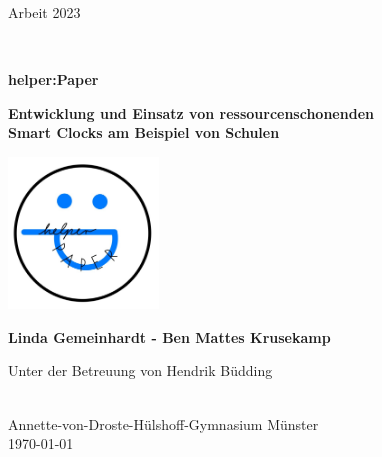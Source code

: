 \documentclass[10pt]{article}
\begin{document}
\begin{titlepage}
\begin{center}
{
\hspace{1.5em}
\begin{minipage}[c]{0.15\textwidth}
\vspace{0.15em}

\end{minipage}
\begin{minipage}[c]{0.15\textwidth}
 {\huge Arbeit 2023}
\end{minipage}
}
\\[9ex]
{\centerline{\huge\bfseries helper:Paper} 
\large \bfseries Entwicklung und Einsatz von ressourcenschonenden\\
Smart Clocks am Beispiel von Schulen}
 
\vspace{6ex}
\centerline{
\includegraphics[width=0.3\textwidth]{helperPaper_Logo.jpg}
}
\vspace{20ex}
{\large\bfseries  Linda Gemeinhardt - Ben Mattes Krusekamp} \\
\vspace{2ex}
\centerline{\large Unter der Betreuung von Hendrik Büdding}
\vspace{6ex}
\vfill
 \\
\vspace{1ex}
\large Annette-von-Droste-Hülshoff-Gymnasium Münster  \\
  \vfill
  \today
\end{center}



\end{titlepage}
\end{document}
